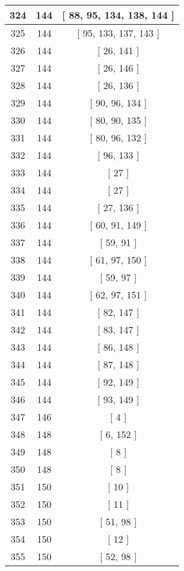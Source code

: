 \begin{center}
\begin{longtable}[H]{|| c c c ||}
\hline
324 & 144 & [ 88, 95, 134, 138, 144 ] \\ 
\hline
325 & 144 & [ 95, 133, 137, 143 ] \\ 
\hline
326 & 144 & [ 26, 141 ] \\ 
\hline
327 & 144 & [ 26, 146 ] \\ 
\hline
328 & 144 & [ 26, 136 ] \\ 
\hline
329 & 144 & [ 90, 96, 134 ] \\ 
\hline
330 & 144 & [ 80, 90, 135 ] \\ 
\hline
331 & 144 & [ 80, 96, 132 ] \\ 
\hline
332 & 144 & [ 96, 133 ] \\ 
\hline
333 & 144 & [ 27 ] \\ 
\hline
334 & 144 & [ 27 ] \\ 
\hline
335 & 144 & [ 27, 136 ] \\ 
\hline
336 & 144 & [ 60, 91, 149 ] \\ 
\hline
337 & 144 & [ 59, 91 ] \\ 
\hline
338 & 144 & [ 61, 97, 150 ] \\ 
\hline
339 & 144 & [ 59, 97 ] \\ 
\hline
340 & 144 & [ 62, 97, 151 ] \\ 
\hline
341 & 144 & [ 82, 147 ] \\ 
\hline
342 & 144 & [ 83, 147 ] \\ 
\hline
343 & 144 & [ 86, 148 ] \\ 
\hline
344 & 144 & [ 87, 148 ] \\ 
\hline
345 & 144 & [ 92, 149 ] \\ 
\hline
346 & 144 & [ 93, 149 ] \\ 
\hline
347 & 146 & [ 4 ] \\ 
\hline
348 & 148 & [ 6, 152 ] \\ 
\hline
349 & 148 & [ 8 ] \\ 
\hline
350 & 148 & [ 8 ] \\ 
\hline
351 & 150 & [ 10 ] \\ 
\hline
352 & 150 & [ 11 ] \\ 
\hline
353 & 150 & [ 51, 98 ] \\ 
\hline
354 & 150 & [ 12 ] \\ 
\hline
355 & 150 & [ 52, 98 ] \\ 
\hline
\end{longtable}
\end{center}
